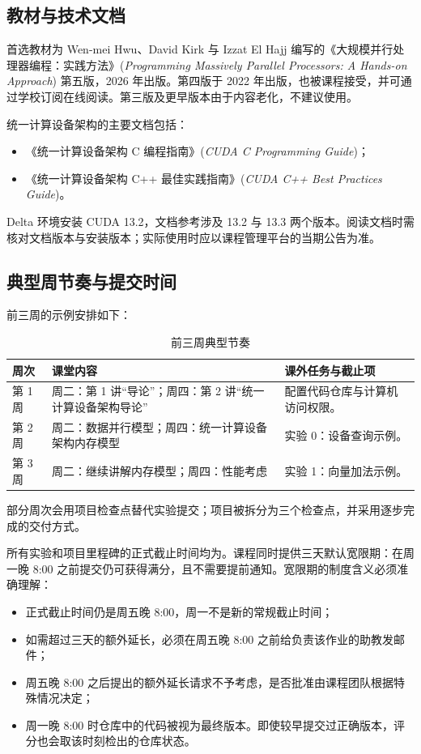 \subsection{教材与技术文档}

首选教材为 Wen-mei Hwu、David Kirk 与 Izzat El Hajj 编写的《大规模并行处理器编程：实践方法》\allowbreak (\textit{Programming Massively Parallel Processors: A Hands-on Approach}) 第五版，2026 年出版。第四版于 2022 年出版，也被课程接受，并可通过学校订阅在线阅读。第三版及更早版本由于内容老化，不建议使用。

统一计算设备架构的主要文档包括：
\begin{itemize}
  \item 《统一计算设备架构 C 编程指南》\allowbreak (\textit{CUDA C Programming Guide})；
  \item 《统一计算设备架构 C++ 最佳实践指南》\allowbreak (\textit{CUDA C++ Best Practices Guide})。
\end{itemize}

Delta 环境安装 CUDA 13.2，文档参考涉及 13.2 与 13.3 两个版本。阅读文档时需核对文档版本与安装版本；实际使用时应以课程管理平台的当期公告为准。

\subsection{典型周节奏与提交时间}

前三周的示例安排如下：
\begin{table}[H]
\centering
\caption{前三周典型节奏}
\begin{tabularx}{\textwidth}{C{0.12\textwidth}Y Y}
\toprule
\textbf{周次} & \textbf{课堂内容} & \textbf{课外任务与截止项} \\
\midrule
第 1 周 & 周二：第 1 讲“导论”；周四：第 2 讲“统一计算设备架构导论” & 配置代码仓库与计算机访问权限。 \\
第 2 周 & 周二：数据并行模型；周四：统一计算设备架构内存模型 & 实验 0：设备查询示例。 \\
第 3 周 & 周二：继续讲解内存模型；周四：性能考虑 & 实验 1：向量加法示例。 \\
\bottomrule
\end{tabularx}
\end{table}

部分周次会用项目检查点替代实验提交；项目被拆分为三个检查点，并采用逐步完成的交付方式。

所有实验和项目里程碑的正式截止时间均为。课程同时提供三天默认宽限期：在周一晚 8:00 之前提交仍可获得满分，且不需要提前通知。宽限期的制度含义必须准确理解：
\begin{itemize}
  \item 正式截止时间仍是周五晚 8:00，周一不是新的常规截止时间；
  \item 如需超过三天的额外延长，必须在周五晚 8:00 之前给负责该作业的助教发邮件；
  \item 周五晚 8:00 之后提出的额外延长请求不予考虑，是否批准由课程团队根据特殊情况决定；
  \item 周一晚 8:00 时仓库中的代码被视为最终版本。即使较早提交过正确版本，评分也会取该时刻检出的仓库状态。
\end{itemize}


